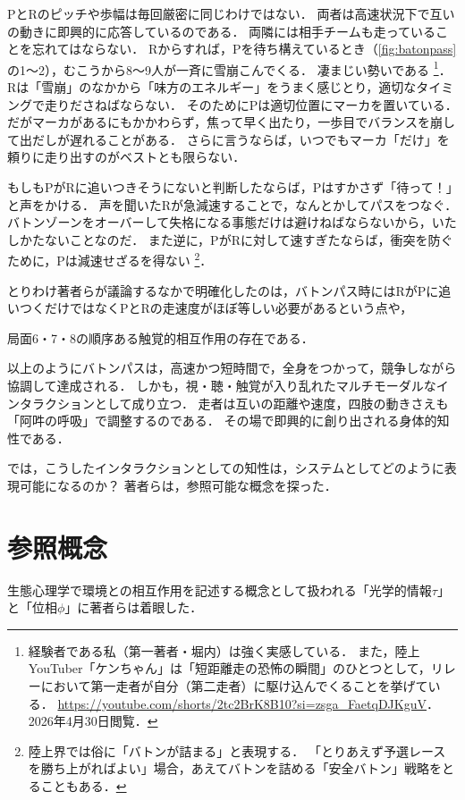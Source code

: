 \documentclass{jsai2e}
\newif\ifshowlabels
\newcommand{\tagtext}[3]{%
  \ifshowlabels
    \textcolor{#1}{#3\textsuperscript{\textsf{[#2]}}}%
  \else
    #3%
  \fi
}
\newcommand{\fix}[2]{\tagtext{fixred}{#1}{#2}}
\begin{document}
PとRのピッチや歩幅は毎回厳密に同じわけではない．
両者は高速状況下で互いの動きに即興的に応答しているのである．
両隣には相手チームも走っていることを忘れてはならない．
Rからすれば，Pを待ち構えているとき（\ref{fig:batonpass}の1〜2），むこうから8〜9人が一斉に雪崩こんでくる．
凄まじい勢いである
\footnote{
経験者である私（第一著者・堀内）は強く実感している．
また，陸上YouTuber「ケンちゃん」は「短距離走の恐怖の瞬間」のひとつとして，リレーにおいて第一走者が自分（第二走者）に駆け込んでくることを挙げている．
  \url{https://youtube.com/shorts/2tc2BrK8B10?si=zsga_FaetqDJKguV}．2026年4月30日閲覧．
}．
Rは「雪崩」のなかから「味方のエネルギー」をうまく感じとり，適切なタイミングで走りださねばならない．
そのためにPは適切位置にマーカを置いている．
だがマーカがあるにもかかわらず，焦って早く出たり，一歩目でバランスを崩して出だしが遅れることがある．
さらに言うならば，いつでもマーカ「だけ」を頼りに走り出すのがベストとも限らない．

もしもPがRに追いつきそうにないと判断したならば，Pはすかさず「待って！」と声をかける．
声を聞いたRが急減速することで，なんとかしてパスをつなぐ．
バトンゾーンをオーバーして失格になる事態だけは避けねばならないから，いたしかたないことなのだ．
また逆に，PがRに対して速すぎたならば，衝突を防ぐために，Pは減速せざるを得ない
\footnote{
  陸上界では俗に「バトンが詰まる」と表現する．
  「とりあえず予選レースを勝ち上がればよい」場合，あえてバトンを詰める「安全バトン」戦略をとることもある．
}．

とりわけ著者らが議論するなかで明確化したのは，バトンパス時にはRがPに追いつくだけではなくPとRの走速度がほぼ等しい必要があるという点や，
\fix{}{局面6・7・8の順序ある触覚的相互作用の存在である．}

以上のようにバトンパスは，高速かつ短時間で，全身をつかって，競争しながら協調して達成される．
しかも，視・聴・触覚が入り乱れたマルチモーダルなインタラクションとして成り立つ．
走者は互いの距離や速度，四肢の動きさえも「阿吽の呼吸」で調整するのである．
その場で即興的に創り出される身体的知性である．

では，こうしたインタラクションとしての知性は，システムとしてどのように表現可能になるのか？
著者らは，参照可能な概念を探った．

\section{参照概念}\label{sec:concepts}
生態心理学で環境との相互作用を記述する概念として扱われる「光学的情報$\tau$」と「位相$\phi$」に著者らは着眼した．
\end{document}
